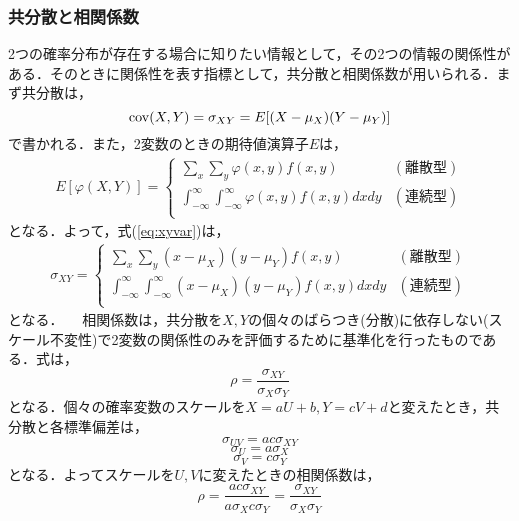 \documentclass[autodetect-engine,dvipdfmx-if-dvi,ja=standard,a4paper,11pt]{bxjsarticle} %
\begin{document}
\subsubsection{共分散と相関係数}
 2つの確率分布が存在する場合に知りたい情報として，その2つの情報の関係性がある．そのときに関係性を表す指標として，共分散と相関係数が用いられる．まず共分散は，
\begin{equation}
\label{eq:xyvar}
{\rm cov}(X,Y)=\sigma_{XY}=E[(X-\mu_X)(Y-\mu_Y)] 
\end{equation}
で書かれる．また，2変数のときの期待値演算子$E$は，
\begin{eqnarray}
E[\varphi(X,Y)] =\left\{ \begin{array}{ll}
\displaystyle\sum_{x}\sum_{y}\varphi(x,y)f(x,y) &  (\mbox{離散型}) \\
\displaystyle\int_{-\infty}^{\infty}\int_{-\infty}^{\infty}\varphi(x,y)f(x,y)dxdy & (\mbox{連続型}) \\
\end{array} \right.
\end{eqnarray}
となる．よって，式(\ref{eq:xyvar})は，
\begin{eqnarray}
\sigma_{XY}=\left\{ \begin{array}{ll}
\displaystyle\sum_{x}\sum_{y}(x-\mu_X)(y-\mu_Y)f(x,y) &  (\mbox{離散型}) \\
\displaystyle\int_{-\infty}^{\infty}\int_{-\infty}^{\infty}(x-\mu_X)(y-\mu_Y)f(x,y)dxdy & (\mbox{連続型}) \\
\end{array} \right.
\end{eqnarray}
となる．
　相関係数は，共分散を$X,Y$の個々のばらつき(分散)に依存しない(スケール不変性)で2変数の関係性のみを評価するために基準化を行ったものである．式は，
\begin{equation}
\rho=\frac{\sigma_{XY}}{\sigma_{X}\sigma_{Y}}
\end{equation}
となる．個々の確率変数のスケールを$X=aU+b,Y=cV+d$と変えたとき，共分散と各標準偏差は，
\begin{equation}
\sigma_{UV}=ac\sigma_{XY}
\end{equation}
\begin{equation}
\sigma_{U}=a\sigma_{X}
\end{equation}
\begin{equation}
\sigma_{V}=c\sigma_{Y}
\end{equation}
となる．よってスケールを$U,V$に変えたときの相関係数は，
\begin{equation}
\rho=\frac{ac\sigma_{XY}}{a\sigma_{X}c\sigma_{Y}}=\frac{\sigma_{XY}}{\sigma_{X}\sigma_{Y}}
\end{equation}
\end{document}
